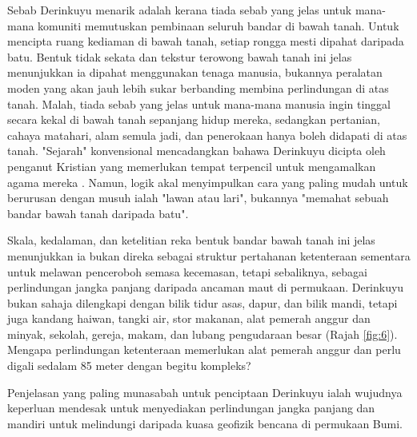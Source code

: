 \documentclass[10pt,twocolumn,letterpaper]{article}
\begin{document}
Sebab Derinkuyu menarik adalah kerana tiada sebab yang jelas untuk mana-mana komuniti memutuskan pembinaan seluruh bandar di bawah tanah. Untuk mencipta ruang kediaman di bawah tanah, setiap rongga mesti dipahat daripada batu. Bentuk tidak sekata dan tekstur terowong bawah tanah ini jelas menunjukkan ia dipahat menggunakan tenaga manusia, bukannya peralatan moden yang akan jauh lebih sukar berbanding membina perlindungan di atas tanah. Malah, tiada sebab yang jelas untuk mana-mana manusia ingin tinggal secara kekal di bawah tanah sepanjang hidup mereka, sedangkan pertanian, cahaya matahari, alam semula jadi, dan penerokaan hanya boleh didapati di atas tanah. "Sejarah" konvensional mencadangkan bahawa Derinkuyu dicipta oleh penganut Kristian yang memerlukan tempat terpencil untuk mengamalkan agama mereka \cite{53}. Namun, logik akal menyimpulkan cara yang paling mudah untuk berurusan dengan musuh ialah "lawan atau lari", bukannya "memahat sebuah bandar bawah tanah daripada batu".

Skala, kedalaman, dan ketelitian reka bentuk bandar bawah tanah ini jelas menunjukkan ia bukan direka sebagai struktur pertahanan ketenteraan sementara untuk melawan penceroboh semasa kecemasan, tetapi sebaliknya, sebagai perlindungan jangka panjang daripada ancaman maut di permukaan. Derinkuyu bukan sahaja dilengkapi dengan bilik tidur asas, dapur, dan bilik mandi, tetapi juga kandang haiwan, tangki air, stor makanan, alat pemerah anggur dan minyak, sekolah, gereja, makam, dan lubang pengudaraan besar (Rajah \ref{fig:6}). Mengapa perlindungan ketenteraan memerlukan alat pemerah anggur dan perlu digali sedalam 85 meter dengan begitu kompleks?

Penjelasan yang paling munasabah untuk penciptaan Derinkuyu ialah wujudnya keperluan mendesak untuk menyediakan perlindungan jangka panjang dan mandiri untuk melindungi daripada kuasa geofizik bencana di permukaan Bumi.
\end{document}
